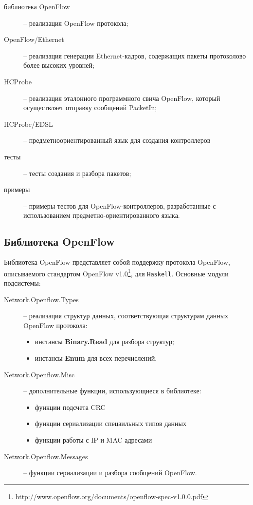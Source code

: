\documentclass[9pt,a4paper]{article}
\begin{document}
\begin{description}
    \item[библиотека OpenFlow] -- реализация OpenFlow протокола;
    \item[OpenFlow/Ethernet]   -- реализация генерации Ethernet-кадров, содержащих пакеты протоколово более высоких уровней;
    \item[HCProbe]             -- реализация эталонного программного свича OpenFlow, который осуществляет отправку сообщений PacketIn;
    \item[HCProbe/EDSL]        -- предметноориентированный язык для создания контроллеров
    \item[тесты]               -- тесты создания и разбора пакетов;
    \item[примеры]             -- примеры тестов для OpenFlow-контроллеров, разработанные с использованием предметно-ориентированного языка.
\end{description}


\subsection{Библиотека OpenFlow}

Библиотека OpenFlow представляет собой поддержку протокола 
OpenFlow, описываемого стандартом OpenFlow 
v1.0\footnote{http://www.openflow.org/documents/openflow-spec-v1.0.0.pdf},
для \texttt{Haskell}. Основные модули подсистемы:

\begin{description}
    \item[Network.Openflow.Types] -- реализация структур данных, соответствующая структурам данных OpenFlow протокола:
        \begin{itemize}
            \item инстансы \textbf{Binary.Read} для разбора структур;
            \item инстансы \textbf{Enum} для всех перечислений.
        \end{itemize}
    \item[Network.Openflow.Misc] -- дополнительные функции, использующиеся в библиотеке:
        \begin{itemize}
            \item функции подсчета CRC
            \item функции сериализации спецаильных типов данных
            \item функции работы с IP и MAC адресами
        \end{itemize}
    \item[Network.Openflow.Messages] -- функции сериализации и разбора сообщений OpenFlow.
\end{description}
\end{document}

